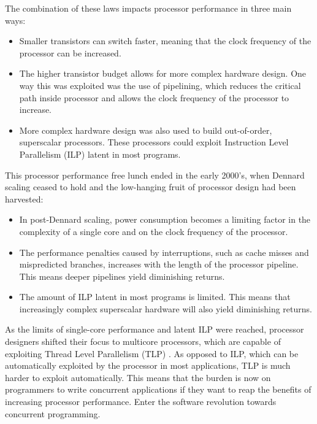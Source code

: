 \documentclass[12pt,a4paper,oneside,openright]{report}
\begin{document}

The combination of these laws impacts processor performance in three
main ways:

\begin{itemize}
\item Smaller transistors can switch faster, meaning that the clock
  frequency of the processor can be increased.
  
\item The higher transistor budget allows for more complex hardware
  design. One way this was exploited was the use of pipelining, which
  reduces the critical path inside processor and allows the clock
  frequency of the processor to increase.
  
\item More complex hardware design was also used to build
  out-of-order, superscalar processors. These processors could exploit
  Instruction Level Parallelism (ILP) \cite[Chapter~3]{CompArchBook}
  latent in most programs.
\end{itemize}

This processor performance free lunch \cite{FreeLunchIsOver} ended in
the early 2000's, when Dennard scaling ceased to hold and the
low-hanging fruit of processor design had been harvested:

\begin{itemize}
\item In post-Dennard scaling, power consumption becomes a limiting
  factor in the complexity of a single core and on the clock frequency
  of the processor.
  
\item The performance penalties caused by interruptions, such as cache
  misses and mispredicted branches, increases with the length of the
  processor pipeline. This means deeper pipelines yield diminishing
  returns.
  
\item The amount of ILP latent in most programs is limited. This means
  that increasingly complex superscalar hardware will also yield
  diminishing returns.
\end{itemize}

As the limits of single-core performance and latent ILP were reached,
processor designers shifted their focus to multicore processors, which
are capable of exploiting Thread Level Parallelism (TLP)
\cite[Chapter~5]{CompArchBook}. As opposed to ILP, which can be
automatically exploited by the processor in most applications, TLP is
much harder to exploit automatically. This means that the burden is
now on programmers to write concurrent applications if they want to
reap the benefits of increasing processor performance. Enter the
software revolution towards concurrent programming.
\end{document}
